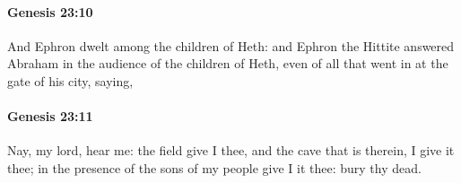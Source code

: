 		\paragraph{Genesis 23:10} %
			\label{GENESIS-23-10}

			And Ephron dwelt among the children of Heth: and Ephron the Hittite answered Abraham in the audience of the children of Heth, even of all that went in at the gate of his city, saying,


		\paragraph{Genesis 23:11} %
			\label{GENESIS-23-11}

			Nay, my lord, hear me: the field give I thee, and the cave that is therein, I give it thee; in the presence of the sons of my people give I it thee: bury thy dead.


